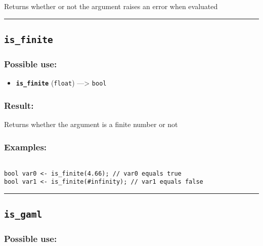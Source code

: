 \documentclass[]{book}
\providecommand{\tightlist}{%
  \setlength{\itemsep}{0pt}\setlength{\parskip}{0pt}}
\theoremstyle{definition}
\theoremstyle{definition}
\theoremstyle{definition}
\theoremstyle{remark}
\begin{document}
Returns whether or not the argument raises an error when evaluated

\begin{center}\rule{0.5\linewidth}{\linethickness}\end{center}

\subsection{\texorpdfstring{\texttt{is\_finite}}{is\_finite}}\label{is_finite}

\subsubsection{Possible use:}\label{possible-use-288}

\begin{itemize}
\tightlist
\item
  \textbf{\texttt{is\_finite}} (\texttt{float}) ---\textgreater{}
  \texttt{bool}
\end{itemize}

\subsubsection{Result:}\label{result-278}

Returns whether the argument is a finite number or not

\subsubsection{Examples:}\label{examples-215}

\begin{verbatim}
 
bool var0 <- is_finite(4.66); // var0 equals true 
bool var1 <- is_finite(#infinity); // var1 equals false
\end{verbatim}

\begin{center}\rule{0.5\linewidth}{\linethickness}\end{center}

\subsection{\texorpdfstring{\texttt{is\_gaml}}{is\_gaml}}\label{is_gaml}

\subsubsection{Possible use:}\label{possible-use-289}
\end{document}
